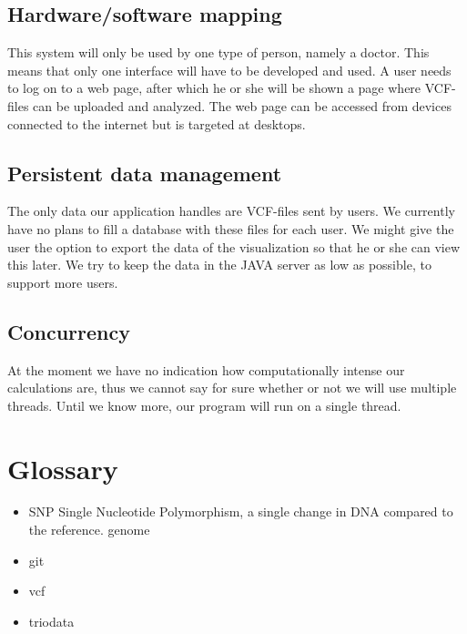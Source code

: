 \documentclass[a4paper]{article}
\begin{document}
		\subsection{Hardware/software mapping}
			This system will only be used by one type of person, namely a doctor. This means that only one interface will have to be developed and used. A user needs to log on to a web page, after which he or she will be shown a page where VCF-files can be uploaded and analyzed. The web page can be accessed from devices connected to the internet but is targeted at desktops.
		\subsection{Persistent data management}
			The only data our application handles are VCF-files sent by users. We currently have no plans to fill a database with these files for each user. We might give the user the option to export the data of the visualization so that he or she can view this later. We try to keep the data in the JAVA server as low as possible, to support more users.
		\subsection{Concurrency }
			At the moment we have no indication how computationally intense our calculations are, thus we cannot say for sure whether or not we will use multiple threads. Until we know more, our program will run on a single thread.
			
	\section{Glossary}
		\begin{itemize}
			\item SNP
				\subitem Single Nucleotide Polymorphism, a single change in DNA compared to the reference. genome
			\item git
			\item vcf
			\item triodata
		\end{itemize}
\end{document}
